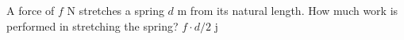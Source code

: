{A force of $f$ N stretches a spring $d$ m from its natural length. How much work is performed in stretching the spring?}
{$f\cdot d/2$ j}
